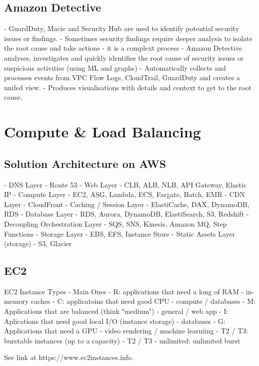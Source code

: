 \documentclass[11pt]{book}
\begin{document}
    \section{Amazon Detective}
    - GuardDuty, Macie and Security Hub are used to identify potential security issues or findings.
    - Sometimes security findings require deeper analysis to isolate the root cause and take actions - it is a complext process
    - Amazon Detective analyses, investigates and quickly identifies the root cause of security issues or suspicious activities (using ML and graphs)
    - Automatically collects and processes events from VPC Flow Logs, CloudTrail, GuardDuty and creates a unifed view.
    - Produces visualisations with details and context to get to the root cause.

    \chapter{Compute \& Load Balancing}

    \section{Solution Architecture on AWS}
    - DNS Layer - Route 53
    - Web Layer - CLB, ALB, NLB, API Gateway, Elastic IP
    - Compute Layer - EC2, ASG, Lambda, ECS, Fargate, Batch, EMR
    - CDN Layer - CloudFront
    - Caching / Session Layer - ElastiCache, DAX, DynamoDB, RDS
    - Database Layer - RDS, Aurora, DynamoDB, ElastiSearch, S3, Redshift
    - Decoupling Orchestration Layer - SQS, SNS, Kinesis, Amazon MQ, Step Functions
    - Storage Layer - EBS, EFS, Instance Store
    - Static Assets Layer (storage) - S3, Glacier

    \section{EC2}
    EC2 Instance Types - Main Ones
    - R: applications that need a long of RAM - in-memory caches
    - C: applicatoins that need good CPU - compute / databases
    - M: Applications that are balanced (think "medium") - general / web app
    - I: Aplications that need good local I/O (instance storage) - databases
    - G: Applications that need a GPU - video rendering / machine learniing
    - T2 / T3: burstable instances (up to a capacity)
    - T2 / T3 - unlimited: unlimited burst

    See link at https://www.ec2instances.info.
\end{document}
